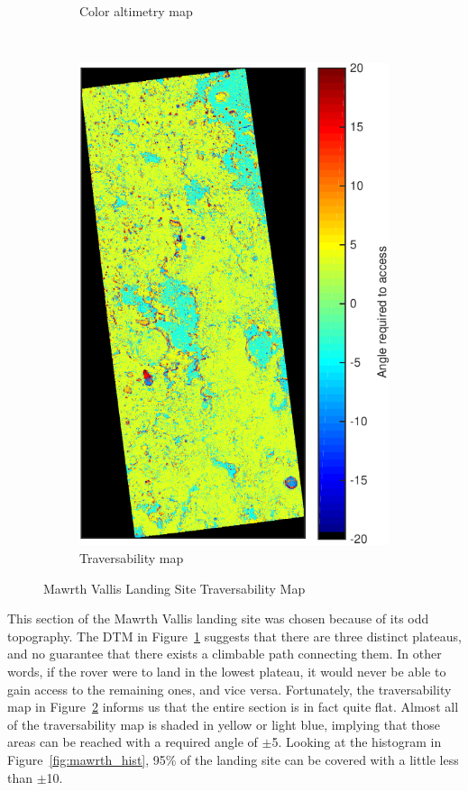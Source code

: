 \documentclass[12pt]{article}
\begin{document}
\begin{figure}[h!]
\begin{subfigure}[t]{0.35\textwidth}
    \caption{Color altimetry map}
    \label{fig:mawrth_dtm}
  \end{subfigure}
  ~
  \begin{subfigure}[t]{0.35\textwidth}
    \centering
    \includegraphics[height=0.4\paperheight]{figures/maps/ESP_015985_2040/DTEEC_015985_2040_016262_2040_U01-traversability_map.pdf}
    \caption{Traversability map}
    \label{fig:mawrth_traversability}
  \end{subfigure}
  \caption{Mawrth Vallis Landing Site Traversability Map}
  \label{fig:mawrth}
\end{figure}
\par This section of the Mawrth Vallis landing site was chosen because of its odd topography. The DTM in Figure~\ref{fig:mawrth_dtm} suggests that there are three distinct plateaus, and no guarantee that there exists a climbable path connecting them. In other words, if the rover were to land in the lowest plateau, it would never be able to gain access to the remaining ones, and vice versa. Fortunately, the traversability map in Figure~\ref{fig:mawrth_traversability} informs us that the entire section is in fact quite flat. Almost all of the traversability map is shaded in yellow or light blue, implying that those areas can be reached with a required angle of $\pm$5\textdegree. Looking at the histogram in Figure~\ref{fig:mawrth_hist}, 95\% of the landing site can be covered with a little less than $\pm$10\textdegree.
\end{document}
